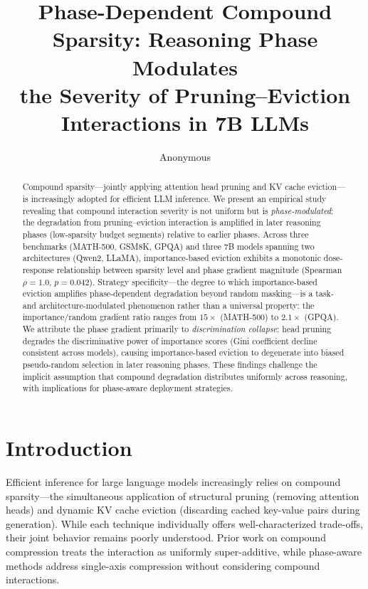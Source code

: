 \documentclass[11pt]{article}
\title{Phase-Dependent Compound Sparsity: Reasoning Phase Modulates\\the Severity of Pruning--Eviction Interactions in 7B LLMs}
\author{Anonymous}
\date{}
\begin{document}
\maketitle

\begin{abstract}
Compound sparsity---jointly applying attention head pruning and KV cache eviction---is increasingly adopted for efficient LLM inference. We present an empirical study revealing that compound interaction severity is not uniform but is \emph{phase-modulated}: the degradation from pruning--eviction interaction is amplified in later reasoning phases (low-sparsity budget segments) relative to earlier phases. Across three benchmarks (MATH-500, GSM8K, GPQA) and three 7B models spanning two architectures (Qwen2, LLaMA), importance-based eviction exhibits a monotonic dose-response relationship between sparsity level and phase gradient magnitude (Spearman $\rho=1.0$, $p=0.042$). Strategy specificity---the degree to which importance-based eviction amplifies phase-dependent degradation beyond random masking---is a task- and architecture-modulated phenomenon rather than a universal property: the importance/random gradient ratio ranges from $15\times$ (MATH-500) to $2.1\times$ (GPQA). We attribute the phase gradient primarily to \emph{discrimination collapse}: head pruning degrades the discriminative power of importance scores (Gini coefficient decline consistent across models), causing importance-based eviction to degenerate into biased pseudo-random selection in later reasoning phases. These findings challenge the implicit assumption that compound degradation distributes uniformly across reasoning, with implications for phase-aware deployment strategies.
\end{abstract}

\section{Introduction}

Efficient inference for large language models increasingly relies on compound sparsity---the simultaneous application of structural pruning (removing attention heads) and dynamic KV cache eviction (discarding cached key-value pairs during generation). While each technique individually offers well-characterized trade-offs, their joint behavior remains poorly understood. Prior work on compound compression \citep{spark2025} treats the interaction as uniformly super-additive, while phase-aware methods \citep{thinkv2025} address single-axis compression without considering compound interactions.
\end{document}
